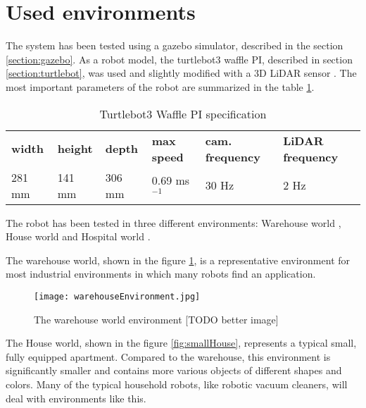 \section{Used environments}\label{section:environments}

The system has been tested using a gazebo simulator, described in the section \ref{section:gazebo}. As a robot model, the turtlebot3 waffle PI, described in section \ref{section:turtlebot}, was used and slightly modified with a 3D LiDAR sensor \cite{VelodyneSimulator}. The most important parameters of the robot are summarized in the table \ref{tab:turtlebot}.

\begin{table}[htpb]
    \caption{Turtlebot3 Waffle PI specification}\label{tab:turtlebot}
    \centering
    \begin{tabular}{l l l l l l}
        \toprule
        \textbf{width} & \textbf{height} & \textbf{depth} & \textbf{max speed} & \textbf{cam. frequency} & \textbf{LiDAR frequency} \\
        281 mm         & 141 mm          & 306 mm         & 0.69 ms${}^{-1}$   & 30 Hz                   & 2 Hz                     \\
        \bottomrule
    \end{tabular}
\end{table}

The robot has been tested in three different environments: Warehouse world \cite{WarehouseWorld}, House world \cite{HouseWorld} and Hospital world \cite{HospitalWorld}.\par
The warehouse world, shown in the figure \ref{fig:warehouseWorld}, is a representative environment for most industrial environments in which many robots find an application.\par

\begin{figure}[htpb]
    \centering
    \texttt{[image: warehouseEnvironment.jpg]}
    \caption{The warehouse world environment [TODO better image]} \label{fig:warehouseWorld}
\end{figure}

The House world, shown in the figure \ref{fig:smallHouse}, represents a typical small, fully equipped apartment. Compared to the warehouse, this environment is significantly smaller and contains more various objects of different shapes and colors. Many of the typical household robots, like robotic vacuum cleaners, will deal with environments like this.\par

